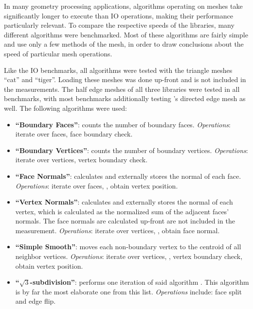 In many geometry processing applications, algorithms operating on meshes take significantly longer to execute than IO operations, making their performance particularly relevant.
To compare the respective speeds of the libraries, many different algorithms were benchmarked.
Most of these algorithms are fairly simple and use only a few methods of the mesh, in order to draw conclusions about the speed of particular mesh operations.

Like the IO benchmarks, all algorithms were tested with the triangle meshes \enquote{cat} and \enquote{tiger}.
Loading these meshes was done up-front and is not included in the measurements.
The half edge meshes of all three libraries were tested in all benchmarks, with most benchmarks additionally testing 's directed edge mesh as well.
The following algorithms were used:

\begin{itemize}
  \item \textbf{\enquote{Boundary Faces}}: counts the number of boundary faces.
  \emph{Operations}: iterate over faces, face boundary check.
  \item \textbf{\enquote{Boundary Vertices}}: counts the number of boundary vertices.
  \emph{Operations}: iterate over vertices, vertex boundary check.
  \item \textbf{\enquote{Face Normals}}: calculates and externally stores the normal of each face.
  \emph{Operations}: iterate over faces, , obtain vertex position.
  \item \textbf{\enquote{Vertex Normals}}: calculates and externally stores the normal of each vertex, which is calculated as the normalized sum of the adjacent faces' normals.
  The face normals are calculated up-front are not included in the measurement.
  \emph{Operations}: iterate over vertices, , obtain face normal.
  \item \textbf{\enquote{Simple Smooth}}: moves each non-boundary vertex to the centroid of all neighbor vertices.
  \emph{Operations}: iterate over vertices, , vertex boundary check, obtain vertex position.
  \item \textbf{\enquote{$\sqrt{3}$-subdivision}}: performs one iteration of said algorithm \cite{kobbelt20003}.
  This algorithm is by far the most elaborate one from this list.
  \emph{Operations} include: face split and edge flip.
\end{itemize}

\vspace{1cm}

